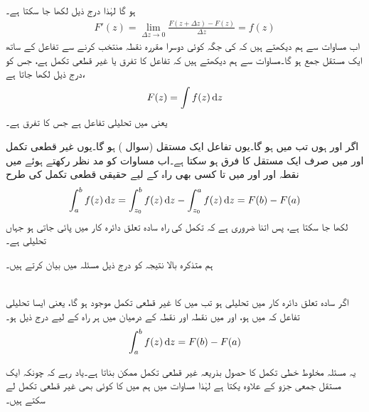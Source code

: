 ہو گا لہٰذا درج ذیل لکھا جا سکتا ہے۔
\begin{align}\label{مساوات_مخلوط_تکمل_بذریعہ_غیر_قطعی_تکمل_ب}
F'(z)=\lim_{\Delta z\to 0} \frac{F(z+\Delta z)-F(z)}{\Delta z}=f(z)
\end{align}
اب مساوات  سے ہم دیکھتے ہیں کہ  کی جگہ کوئی دوسرا مقررہ نقطہ منتخب کرنے سے  تفاعل  کے ساتھ ایک مستقل جمع ہو گا۔مساوات  سے ہم دیکھتے ہیں کہ  تفاعل  کا تفرق یا غیر قطعی تکمل ہے، جس کو درج ذیل لکھا جاتا ہے،
\begin{align*}
F(z)=\int f(z)\dif z
\end{align*}
یعنی   میں  تحلیلی تفاعل ہے جس کا تفرق  ہے۔

اگر  اور  ہوں تب  میں  ہو گا۔یوں تفاعل  ایک مستقل (سوال ) ہو گا۔یوں غیر قطعی تکمل  اور  میں صرف ایک مستقل کا فرق ہو سکتا ہے۔اب مساوات  کو مد نظر رکھتے ہوئے  میں نقطہ  اور  اور    میں  تا   کسی بھی راہ کے لیے حقیقی قطعی تکمل کی طرح
\begin{align*}
\int_a^b f(z)\dif z=\int_{z_0}^b f(z)\dif z-\int_{z_0}^a f(z)\dif z=F(b)-F(a)
\end{align*}
لکھا جا سکتا ہے، پس اتنا ضروری ہے کہ تکمل کی راہ سادہ تعلق دائرہ کار  میں پائی جاتی ہو جہاں  تحلیلی ہے۔ 

ہم متذکرہ بالا نتیجہ کو درج ذیل مسئلہ میں بیان کرتے ہیں۔

\quad {}\\
اگر سادہ تعلق دائرہ کار  میں  تحلیلی ہو تب  میں  کا غیر قطعی تکمل موجود ہو گا، یعنی ایسا تحلیلی تفاعل  کہ  میں  ہو، اور  میں نقطہ  اور نقطہ  کے درمیان  میں ہر راہ کے لیے درج ذیل ہو۔
\begin{align}\label{مساوات_مخلوط_تکمل_بذریعہ_غیر_قطعی_تکمل}
\int_a^b f(z)\dif z=F(b)-F(a)
\end{align}

یہ مسئلہ مخلوط خطی تکمل کا حصول بذریعہ غیر قطعی تکمل ممکن بناتا ہے۔یاد رہے کہ چونکہ  ایک مستقل جمعی جزو کے علاوہ یکتا ہے لہٰذا مساوات  میں ہم  میں   کا کوئی بھی غیر قطعی تکمل   لے سکتے ہیں۔

